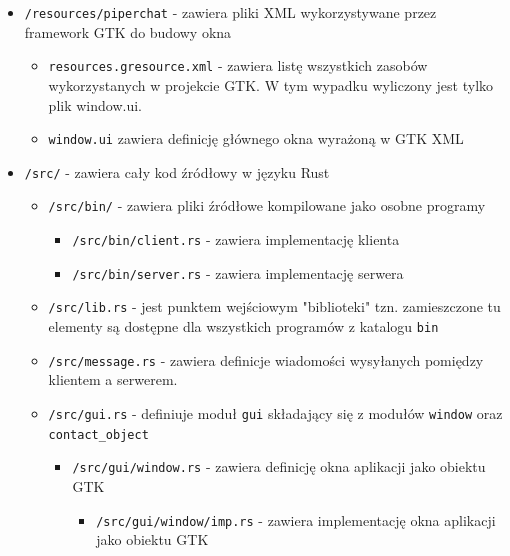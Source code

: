 \begin{itemize}
    \item \verb|/resources/piperchat| - zawiera pliki XML wykorzystywane przez framework GTK do
          budowy okna
          \begin{itemize}
              \item \verb|resources.gresource.xml| - zawiera listę wszystkich zasobów wykorzystanych w
                    projekcie GTK. W tym wypadku wyliczony jest tylko plik window.ui.
              \item \verb|window.ui| zawiera definicję głównego okna wyrażoną w GTK XML
          \end{itemize}

    \item \verb|/src/| - zawiera cały kod źródłowy w języku Rust
          \begin{itemize}
              \item \verb|/src/bin/| - zawiera pliki źródłowe kompilowane jako osobne programy
                    \begin{itemize}
                        \item \verb|/src/bin/client.rs| - zawiera implementację klienta
                        \item \verb|/src/bin/server.rs| - zawiera implementację serwera
                    \end{itemize}
              \item \verb|/src/lib.rs| - jest punktem wejściowym "biblioteki" tzn. zamieszczone tu
                    elementy są dostępne dla wszystkich programów z katalogu \verb|bin|
              \item \verb|/src/message.rs| - zawiera definicje wiadomości wysyłanych pomiędzy
                    klientem a serwerem.
              \item \verb|/src/gui.rs| - definiuje moduł \verb|gui| składający się z modułów
                    \verb|window| oraz \verb|contact_object|
                    \begin{itemize}
                        \item \verb|/src/gui/window.rs| - zawiera definicję okna aplikacji jako
                              obiektu GTK
                              \begin{itemize}
                                  \item \verb|/src/gui/window/imp.rs| - zawiera implementację okna
                                        aplikacji jako obiektu GTK
                              \end{itemize}

\end{itemize}
\end{itemize}
\end{itemize}
